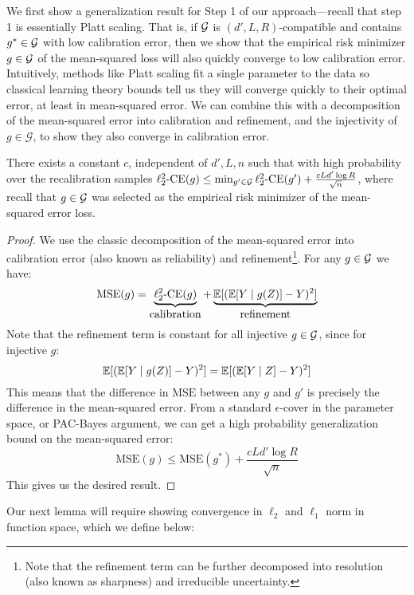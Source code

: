 We first show a generalization result for Step 1 of our approach---recall that step 1 is essentially Platt scaling.
That is, if $\mathcal{G}{}$ is $(d', L, R)$-compatible and contains $g^* \in \mathcal{G}{}$ with low calibration error, then we show that the empirical risk minimizer $g \in \mathcal{G}{}$ of the mean-squared loss will also quickly converge to low calibration error.
Intuitively, methods like Platt scaling fit a single parameter to the data so classical learning theory bounds tell us they will converge quickly to their optimal error, at least in mean-squared error.
We can combine this with a decomposition of the mean-squared error into calibration and refinement, and the injectivity of $g \in \mathcal{G}$, to show they also converge in calibration error.

\begin{lemma}
\label{lem:platt_scaling_bound}
There exists a constant $c$, independent of $d', L, n$ such that with high probability over the recalibration samples $\ell_2^2\mbox{-CE}(g) \leq \min_{g' \in \mathcal{G}{}}\ell_2^2\mbox{-CE}(g') + \frac{cLd' \log{R}}{\sqrt{n}}$, where recall that $g \in \mathcal{G}{}$ was selected as the empirical risk minimizer of the mean-squared error loss.
\end{lemma}

\begin{proof}
We use the classic decomposition of the mean-squared error into calibration error (also known as reliability) and refinement\footnote{Note that the refinement term can be further decomposed into resolution (also known as sharpness) and irreducible uncertainty.}. For any $g \in \mathcal{G}{}$ we have:
\[ \mbox{MSE}(g) = \underbrace{\ell_2^2\mbox{-CE}(g)}_{\mbox{calibration}} + \underbrace{\mathbb{E}[(\mathbb{E}[Y \mid g(Z)] - Y)^2]}_{\mbox{refinement}} \]
Note that the refinement term is constant for all injective $g \in \mathcal{G}{}$, since for injective $g$:
\[ \mathbb{E}[(\mathbb{E}[Y \mid g(Z)] - Y)^2] = \mathbb{E}[(\mathbb{E}[Y \mid Z] - Y)^2] \]
This means that the difference in $\mbox{MSE}$ between any $g$ and $g'$ is precisely the difference in the mean-squared error. From a standard $\epsilon$-cover in the parameter space, or PAC-Bayes argument, we can get a high probability generalization bound on the mean-squared error:
\[ \mbox{MSE}(g) \leq \mbox{MSE}(g^*) + \frac{cLd' \log{R}}{\sqrt{n}} \]
This gives us the desired result.
\end{proof}

Our next lemma will require showing convergence in $\ell_2$ and $\ell_1$ norm in function space, which we define below:

